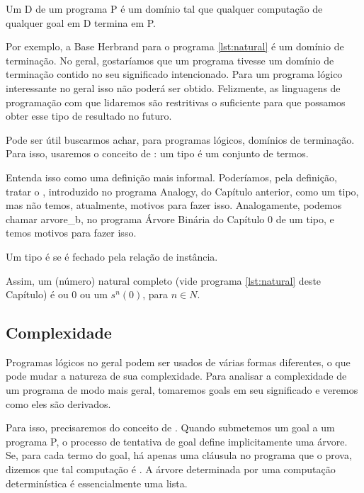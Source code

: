 \documentclass{article}
\begin{document}
\begin{definition}
  Um  D de um programa P é um domínio tal que qualquer computação de qualquer goal em D termina em P.
\end{definition}

Por exemplo, a Base Herbrand para o programa \ref{lst:natural} é um domínio de terminação.
No geral, gostaríamos que um programa tivesse um domínio de terminação contido no seu significado intencionado. Para um programa lógico interessante no geral isso não poderá ser obtido. Felizmente, as linguagens de programação com que lidaremos são restritivas o suficiente para que possamos obter esse tipo de resultado no futuro.

Pode ser útil buscarmos achar, para programas lógicos, domínios de terminação. Para isso, usaremos o conceito de : um tipo é um conjunto de termos.

Entenda isso como uma definição mais informal. Poderíamos, pela definição, tratar o , introduzido no programa Analogy, do Capítulo anterior, como um tipo, mas não temos, atualmente, motivos para fazer isso.
Analogamente, podemos chamar arvore\_b, no programa Árvore Binária do Capítulo 0 de um tipo, %
e temos motivos para fazer isso.

\begin{definition} Um tipo é  se é fechado pela relação de instância.
\end{definition}

Assim, um (número) natural completo (vide programa \ref{lst:natural} deste Capítulo) é ou 0 ou um $s^n(0)$, para $n \in N$.

\subsection{Complexidade}

Programas lógicos no geral podem ser usados de várias formas diferentes, o que pode mudar a natureza de sua complexidade. Para analisar a complexidade de um programa de modo mais geral, tomaremos goals em seu significado e veremos como eles são derivados.

Para isso, precisaremos do conceito de . Quando submetemos um goal a um programa P, o processo de tentativa de goal define implicitamente uma árvore. Se, para cada termo do goal, há apenas uma cláusula no programa que o prova, dizemos que tal computação é . A árvore determinada por uma computação determinística é essencialmente uma lista.
\end{document}
